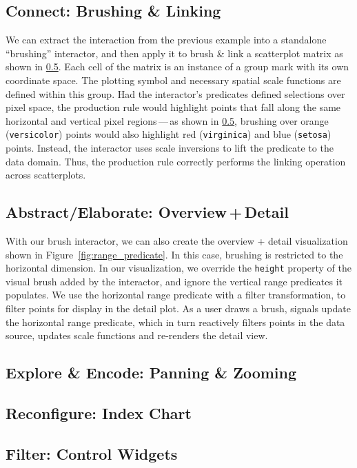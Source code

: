 \subsection{Connect: Brushing \& Linking}

We can extract the interaction from the previous example into a standalone
``brushing'' interactor, and then apply it to brush \& link a scatterplot matrix
as shown in \cref{}. Each cell of the matrix is an instance of a
group mark with its own coordinate space. The plotting symbol and necessary
spatial scale functions are defined within this group. Had the interactor's
predicates defined selections over pixel space, the production rule would
highlight points that fall along the same horizontal and vertical pixel
regions\,---\,as shown in \cref{}\todo{}, brushing over orange
(\texttt{versicolor}) points would also highlight red (\texttt{virginica}) and
blue (\texttt{setosa}) points. Instead, the interactor uses scale inversions to
lift the predicate to the data domain. Thus, the production rule correctly
performs the linking operation across scatterplots.

\subsection{Abstract/Elaborate: Overview\,+\,Detail}

With our brush interactor, we can also create the overview + detail
visualization shown in Figure~\ref{fig:range_predicate}. In this case, brushing
is restricted to the horizontal dimension. In our visualization, we override the
\texttt{height} property of the visual brush added by the interactor, and ignore
the vertical range predicates it populates. We use the horizontal range
predicate with a filter transformation, to filter points for display in the
detail plot. As a user draws a brush, signals update the horizontal range
predicate, which in turn reactively filters points in the data source, updates
scale functions and re-renders the detail view.

\subsection{Explore \& Encode: Panning \& Zooming}

\subsection{Reconfigure: Index Chart}

\subsection{Filter: Control Widgets}

